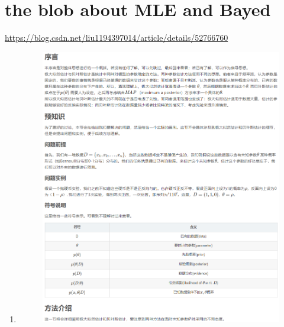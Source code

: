 \documentclass[12pt]{ctexart}%
\begin{document}
	\section{\quad the blob about MLE and Bayed}
		\url{https://blog.csdn.net/liu1194397014/article/details/52766760}		
		\par
		\begin{enumerate}
			\item[]
				\begin{figure}[H]
					\vspace{-0.2cm}  %
					\centering
					\includegraphics[scale=0.8]{MLE_and_Bayes.png}
					\renewcommand{\figurename}{Fig} %
				\end{figure}
			

\end{enumerate}
\end{document}
